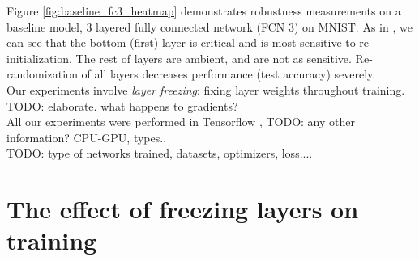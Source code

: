 \documentclass{article}
\begin{document}
Figure \ref{fig:baseline_fc3_heatmap} demonstrates robustness measurements on a baseline model, 3 layered fully connected network (FCN 3) on MNIST. As in \cite{allLayers}, we can see that the bottom (first) layer is critical and is most sensitive to  re-initialization. The rest of layers are ambient, and are not as sensitive. Re-randomization of all layers decreases performance (test accuracy) severely.\\
Our experiments involve \emph{layer freezing}: fixing layer weights throughout training. TODO: elaborate. what happens to gradients?\\
All our experiments were performed in Tensorflow \cite{tensorflow2015-whitepaper}, TODO: any other information? CPU-GPU, types..\\
TODO: type of networks trained, datasets, optimizers, loss....

\section{The effect of freezing layers on training} \label{training}
\end{document}
